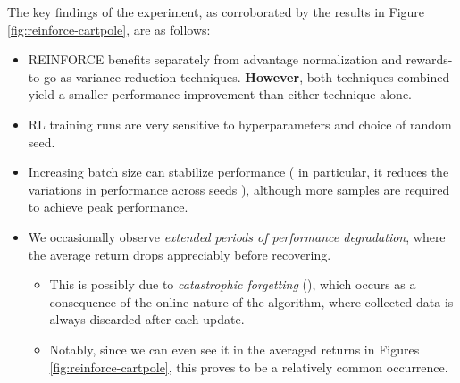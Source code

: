 \documentclass{article} %
\theoremstyle{definition}
\begin{document}
The key findings of the experiment, as corroborated
by the results in Figure \ref{fig:reinforce-cartpole}, are as follows:
\begin{itemize}
    \item REINFORCE benefits separately from advantage normalization and rewards-to-go
        as variance reduction techniques. \textbf{However}, both techniques combined
        yield a smaller performance improvement than either technique alone.
    \item RL training runs are very sensitive to hyperparameters and choice of 
        random seed.
    \item Increasing batch size can stabilize performance (
            in particular, it reduces the variations in performance across seeds
        ), although more
        samples are required to achieve peak performance.
        \item We occasionally observe \textit{extended periods of 
        performance degradation}, where the average return drops appreciably
        before recovering. 
        \begin{itemize}
            \item This is possibly due to \textit{catastrophic forgetting} (\cite{Goodfellow-et-al-2013}), which occurs as a consequence of the online nature of the algorithm,
            where collected data is always discarded after each update.
            \item Notably, since we can even see it in the averaged returns in Figures \ref{fig:reinforce-cartpole},
            this proves to be a relatively common occurrence.
        \end{itemize}
\end{itemize}
\end{document}
